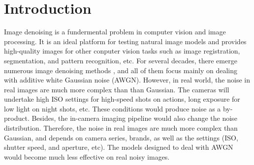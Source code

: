 \documentclass[10pt,twocolumn,letterpaper]{article}
\begin{document}
\section{Introduction}
Image denoising is a fundermental problem in computer vision and image processing. It is an ideal platform for testing natural image models and provides high-quality images for other conputer vision tasks such as image registration, segmentation, and pattern recognition, etc. For several decades, there emerge numerous image denoising methods \cite{nlm,foe,ksvd,bm3d,lssc,epll,mlp,wnnm,csf,pgpd,chen2015learning}, and all of them focus mainly on dealing with additive white Gaussian noise (AWGN). However, in real world, the noise in real images are much more complex than than Gaussian. The cameras will undertake high ISO settings for high-speed shots on actions, long exposure for low light on night shots, etc. These conditions would produce noise as a by-product. Besides, the in-camera imaging pipeline \cite{NewInCamera,crosschannel2016} would also change the noise distribution. Therefore, the noise in real images are much more complex than Gaussian, and depends on camera series, brands, as well as the settings (ISO, shutter speed, and aperture, etc). The models designed to deal with AWGN would become much less effective on real noisy images.

\end{document}
